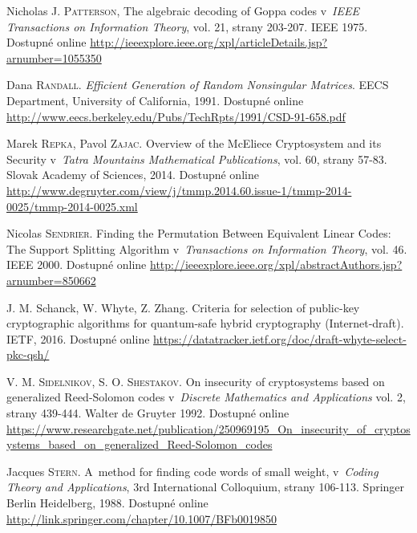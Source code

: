 \documentclass[thesis=M,czech,hidelinks]{FITthesis}[2012/06/26]
\newcommand{\0}{{\textcolor[gray]{0.80}{0}}}
\begin{document}
\begin{thebibliography}{99}

        Nicholas J. \textsc{Patterson}, The algebraic decoding of Goppa codes
        v~\emph{IEEE Transactions on Information Theory}, vol. 21, strany
        203-207. IEEE 1975. Dostupné online
        \url{http://ieeexplore.ieee.org/xpl/articleDetails.jsp?arnumber=1055350}


        Dana \textsc{Randall}. \emph{Efficient Generation of Random Nonsingular
        Matrices}. EECS Department, University of California, 1991. Dostupné
        online
        \url{http://www.eecs.berkeley.edu/Pubs/TechRpts/1991/CSD-91-658.pdf}

        Marek \textsc{Repka}, Pavol \textsc{Zajac}. Overview of the McEliece
        Cryptosystem and its Security v~\emph{Tatra Mountains Mathematical
        Publications}, vol. 60, strany 57-83. Slovak Academy of Sciences, 2014.
        Dostupné online
        \url{http://www.degruyter.com/view/j/tmmp.2014.60.issue-1/tmmp-2014-0025/tmmp-2014-0025.xml}

        Nicolas \textsc{Sendrier}. Finding the Permutation Between Equivalent
        Linear Codes: The Support Splitting Algorithm v~\emph{Transactions on
        Information Theory}, vol. 46. IEEE 2000. Dostupné online
        \url{http://ieeexplore.ieee.org/xpl/abstractAuthors.jsp?arnumber=850662}

        J. M. Schanck, W. Whyte, Z. Zhang. Criteria for selection of public-key
        cryptographic algorithms for quantum-safe hybrid cryptography
        (Internet-draft). IETF, 2016. Dostupné online
        \url{https://datatracker.ietf.org/doc/draft-whyte-select-pkc-qsh/}

        V. M. \textsc{Sidelnikov}, S. O. \textsc{Shestakov}. On insecurity of
        cryptosystems based on generalized Reed-Solomon codes v~\emph{Discrete
        Mathematics and Applications} vol. 2, strany 439-444. Walter de Gruyter
        1992. Dostupné online
        \url{https://www.researchgate.net/publication/250969195\_On\_insecurity\_of\_cryptosystems\_based\_on\_generalized\_Reed-Solomon\_codes}

        Jacques \textsc{Stern}. A~method for finding code words of small weight,
        v~\emph{Coding Theory and Applications}, 3rd International Colloquium,
        strany 106-113. Springer Berlin Heidelberg, 1988. Dostupné online
        \url{http://link.springer.com/chapter/10.1007/BFb0019850}


\end{thebibliography}
\end{document}
